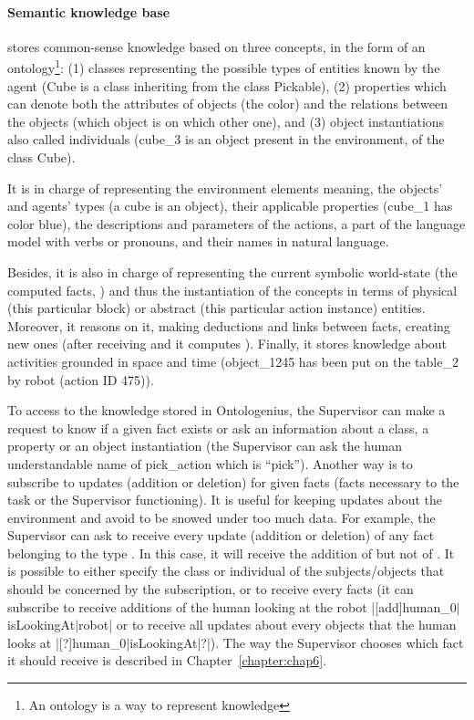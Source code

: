 \documentclass[a4paper,11pt,twoside]{StyleThese}
\begin{document}
\paragraph{Semantic knowledge base} stores common-sense knowledge based on three concepts, in the form of an ontology\footnote{An ontology is a way to represent knowledge}: (1) classes representing the possible types of entities known by the agent (\eg Cube is a class inheriting from the class Pickable), (2) properties which can denote both the attributes of objects (\eg the color) and the relations between the objects (\eg which object is on which other one), and (3) object instantiations also called individuals (\eg cube\_3 is an object present in the environment, of the class Cube).

It is in charge of representing the environment elements meaning, the objects' and agents' types (\eg a cube is an object), their applicable properties (\eg cube\_1 has color blue), the descriptions and parameters of the actions, a part of the language model with verbs or pronouns, and their names in natural language.
	
Besides, it is also in charge of representing the current symbolic world-state (the computed facts, \eg {}) and thus the instantiation of the concepts in terms of physical (\eg this particular block) or abstract (\eg this particular action instance) entities. Moreover, it reasons on it, making deductions and links between facts, creating new ones (\eg after receiving  and it computes ). Finally, it stores knowledge about activities grounded in space and time (\eg object\_1245 has been put on the table\_2 by robot (action ID 475)).

To access to the knowledge stored in Ontologenius, the Supervisor can make a request to know if a given fact exists or ask an information about a class, a property or an object instantiation (\eg the Supervisor can ask the human understandable name of pick\_action which is ``pick''). Another way is to subscribe to updates (addition or deletion) for given facts (\ie facts necessary to the task or the Supervisor functioning). It is useful for keeping updates about the environment and avoid to be snowed under too much data. For example, the Supervisor can ask to receive every update (addition or deletion) of any fact belonging to the type . In this case, it will receive the addition of  but not of . It is possible to either specify the class or individual of the subjects/objects that should be concerned by the subscription, or to receive every facts (\eg it can subscribe to receive additions of the human looking at the robot |[add]human_0$\lvert$isLookingAt$\lvert$robot| or to receive all updates about every objects that the human looks at |[?]human_0$\lvert$isLookingAt$\lvert$?|). The way the Supervisor chooses which fact it should receive is described in Chapter~\ref{chapter:chap6}.
\end{document}

